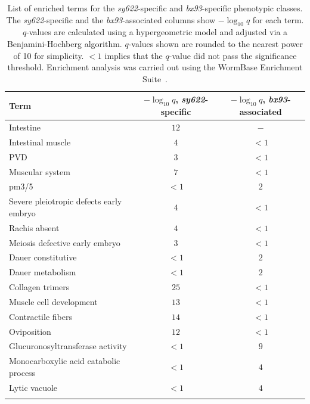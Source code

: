 \documentclass[10pt, onecolumn]{article}
\begin{document}
\begin{table}[tbhp]
  \centering
  \begin{tabular}{lcc}
    \toprule{}Term & $-\log_{10}{q}$, \emph{sy622}-specific &
              $-\log_{10}{q}$, \emph{bx93}-associated\\
    \midrule{}Intestine & $12$ & $-$\\
    Intestinal muscle & $4$ & $<1$\\
    PVD & $3$ & $<1$\\
    Muscular system & $7$ & $<1$\\
    pm3/5 & $<1$ & $2$\\
    Severe pleiotropic defects early embryo & $4$ & $<1$\\
    Rachis absent & $4$ & $<1$\\
    Meiosis defective early embryo & $3$ & $<1$\\
    Dauer constitutive & $<1$ &$2$\\
    Dauer metabolism  & $<1$ &$2$\\
    Collagen trimers  & $25$ & $<1$\\
    Muscle cell development & $13$ & $<1$\\
    Contractile fibers & $14$ & $<1$\\
    Oviposition & $12$ & $<1$\\
    Glucuronosyltransferase activity &$<1$ & $9$\\
    Monocarboxylic acid catabolic process &$<1$ & $4$\\
    Lytic vacuole & $<1$& $4$\\
    \bottomrule{}
  \end{tabular}
  \caption{
    List of enriched terms for the \emph{sy622}-specific and
    \emph{bx93}-specific phenotypic classes. The \emph{sy622}-specific and the
    \emph{bx93}-associated columns show $-\log_{10}{q}$ for each term. $q$-values
    are calculated using a hypergeometric model and adjusted via a
    Benjamini-Hochberg algorithm. $q$-values shown are rounded to the nearest
    power of 10 for simplicity. $<1$ implies that the $q$-value did not pass the
    significance threshold. Enrichment analysis was carried out using the
    WormBase Enrichment Suite~\cite{Angeles-Albores2016}.
  }
\label{tab:enrich}
\end{table}
\end{document}

